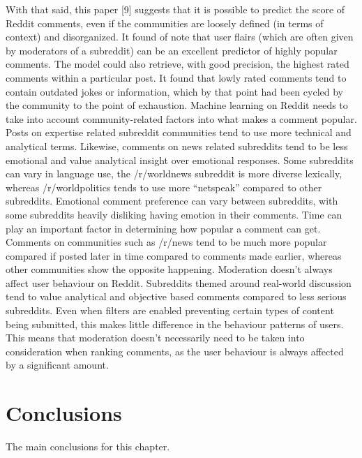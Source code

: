 With that said, this paper [9] suggests that it is possible to predict the score of Reddit comments, even if the communities are loosely defined (in terms of context) and disorganized. It found of note that user flairs (which are often given by moderators of a subreddit) can be an excellent predictor of highly popular comments. The model could also retrieve, with good precision, the highest rated comments within a particular post. It found that lowly rated comments tend to contain outdated jokes or information, which by that point had been cycled by the community to the point of exhaustion. Machine learning on Reddit needs to take into account community-related factors into what makes a comment popular. Posts on expertise related subreddit communities tend to use more technical and analytical terms. Likewise, comments on news related subreddits tend to be less emotional and value analytical insight over emotional responses. Some subreddits can vary in language use, the /r/worldnews subreddit is more diverse lexically, whereas /r/worldpolitics tends to use more “netspeak” compared to other subreddits. Emotional comment preference can vary between subreddits, with some subreddits heavily disliking having emotion in their comments. Time can play an important factor in determining how popular a comment can get. Comments on communities such as /r/news tend to be much more popular compared if posted later in time compared to comments made earlier, whereas other communities show the opposite happening. Moderation doesn’t always affect user behaviour on Reddit. Subreddits themed around real-world discussion tend to value analytical and objective based comments compared to less serious subreddits. Even when filters are enabled preventing certain types of content being submitted, this makes little difference in the behaviour patterns of users. This means that moderation doesn’t necessarily need to be taken into consideration when ranking comments, as the user behaviour is always affected by a significant amount.


\section{Conclusions}

The main conclusions for this chapter.
